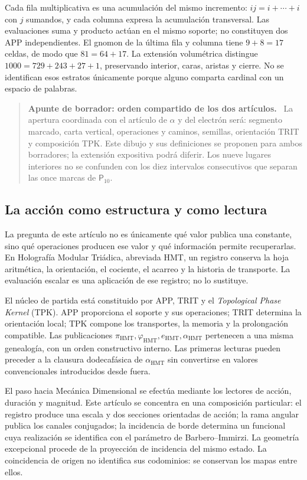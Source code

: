 \documentclass[11pt,a4paper]{article}
\numberwithin{equation}{section}
\theoremstyle{definition}
\newcommand{\HMT}{\mathrm{HMT}}
\newenvironment{apunte}[1]{\par\Needspace{6\baselineskip}\smallskip
\begin{quote}\small\raggedright\color{ink}\noindent\textbf{Apunte de borrador: #1.}\ }
{\end{quote}\smallskip}
\begin{document}
Cada fila multiplicativa es una acumulación del mismo incremento:
$ij=i+\cdots+i$ con $j$ sumandos, y cada columna expresa la
acumulación transversal. Las evaluaciones suma y producto actúan en el
mismo soporte; no constituyen dos APP independientes.
El gnomon de la última fila y columna tiene $9+8=17$ celdas,
de modo que $81=64+17$. La extensión volumétrica distingue
$1000=729+243+27+1$, preservando interior, caras, aristas y cierre.
No se identifican esos estratos únicamente porque alguno comparta cardinal
con un espacio de palabras.

\begin{apunte}{orden compartido de los dos artículos}
La apertura coordinada con el artículo de $\alpha$ y del electrón será:
segmento marcado, carta vertical, operaciones y caminos, semillas,
orientación TRIT y composición TPK. Este dibujo y sus definiciones se
proponen para ambos borradores; la extensión expositiva podrá diferir.
Los nueve lugares interiores no se confunden con los diez intervalos
consecutivos que separan las once marcas de $\mathsf P_{10}$.
\end{apunte}

\subsection{La acción como estructura y como lectura}
La pregunta de este artículo no es únicamente qué valor publica una constante,
sino qué operaciones producen ese valor y qué información permite recuperarlas.
En Holografía Modular Triádica, abreviada HMT, un registro conserva la hoja
aritmética, la orientación, el cociente, el acarreo y la historia de transporte.
La evaluación escalar es una aplicación de ese registro; no lo sustituye.

El núcleo de partida está constituido por APP, TRIT y el
\emph{Topological Phase Kernel} (TPK). APP proporciona el soporte y sus
operaciones; TRIT determina la orientación local; TPK compone los transportes,
la memoria y la prolongación compatible. Las publicaciones
$\pi_{\HMT},\varphi_{\HMT},e_{\HMT},\alpha_{\HMT}$ pertenecen a una misma
genealogía, con un orden constructivo interno. Las primeras lecturas pueden
preceder a la clausura dodecafásica de $\alpha_{\HMT}$ sin convertirse
en valores convencionales introducidos desde fuera.

El paso hacia Mecánica Dimensional se efectúa mediante los lectores de
acción, duración y magnitud. Este artículo se concentra en una composición
particular: el registro produce una escala y dos secciones orientadas de acción;
la rama angular publica los canales conjugados; la incidencia de borde
determina un funcional cuya realización se identifica con el parámetro de
Barbero--Immirzi. La geometría excepcional procede de la proyección de
incidencia del mismo estado. La coincidencia de origen no identifica sus
codominios: se conservan los mapas entre ellos.
\end{document}

